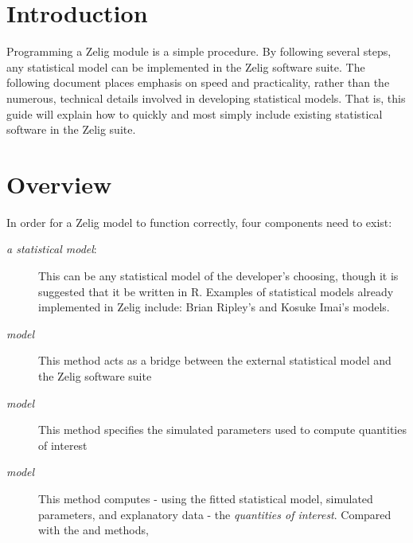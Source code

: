 

\section{Introduction}\label{section:introduction}

Programming a Zelig module is a simple procedure. By following several	 steps, any statistical model can be implemented in the Zelig software suite. The following document places emphasis on speed and practicality, rather than the numerous, technical details involved in developing statistical models. That is, this guide will explain how to quickly and most simply include existing statistical software in the Zelig suite.


	
\section{Overview}\label{section:overview}

In order for a Zelig model to function correctly, four components need to exist:

\begin{description}

	\item[\emph{a statistical model}:] This can be any statistical model of the developer's choosing, though it is suggested that it be written in R. Examples of statistical models already implemented in Zelig include: Brian Ripley's  and Kosuke Imai's  models.

	\item[\emph{model}] This method acts as a bridge between the external statistical model and the Zelig software suite

	\item[\emph{model}] This method specifies the simulated parameters used to compute quantities of interest

	\item[\emph{model}] This method computes - using the fitted statistical model, simulated parameters, and explanatory data - the \emph{quantities of interest}. Compared with the  and  methods, 

\end{description}

